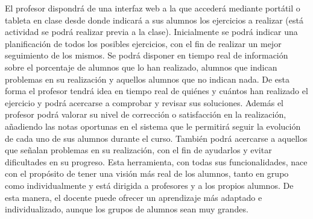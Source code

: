 El profesor dispondrá de una interfaz web a la que accederá mediante portátil o tableta en clase
desde donde indicará a sus alumnos los ejercicios a realizar (está actividad se podrá realizar previa
a la clase). Inicialmente se podrá indicar una planificación de todos los posibles ejercicios, con el
fin de realizar un mejor seguimiento de los mismos. Se podrá disponer en tiempo real de
información sobre el porcentaje de alumnos que lo han realizado, alumnos que indican problemas
en su realización y aquellos alumnos que no indican nada. De esta forma el profesor tendrá idea
en tiempo real de quiénes y cuántos han realizado el ejercicio y podrá acercarse a comprobar y
revisar sus soluciones. Además el profesor podrá valorar su nivel de corrección o satisfacción en la
realización, añadiendo las notas oportunas en el sistema que le permitirá seguir la evolución de
cada uno de sus alumnos durante el curso. También podrá acercarse a aquellos que señalan
problemas en su realización, con el fin de ayudarlos y evitar dificultades en su progreso.
Esta herramienta, con todas sus funcionalidades, nace con el propósito de tener una visión más
real de los alumnos, tanto en grupo como individualmente y está dirigida a profesores y a los propios alumnos. De esta manera, el docente puede ofrecer un aprendizaje más adaptado e
individualizado, aunque los grupos de alumnos sean muy grandes.\\